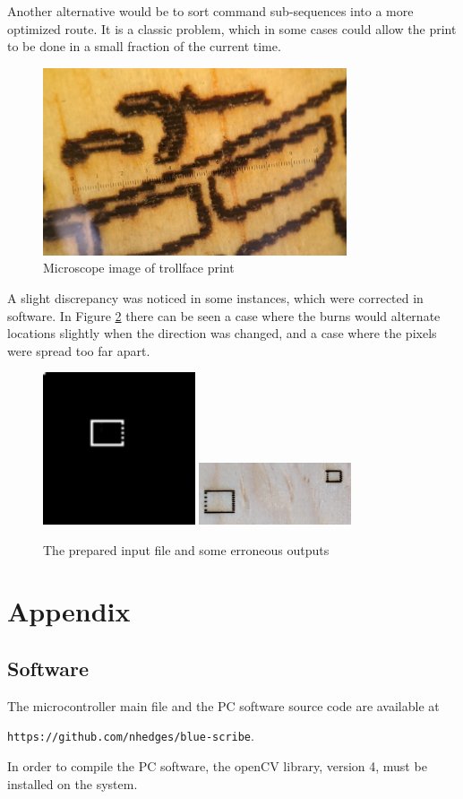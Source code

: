 \documentclass[11pt]{LaTeX-Classes/math-hw}
\begin{document}
Another alternative would be to sort command sub-sequences into a more optimized
route. It is a classic  problem, which in some cases
could allow the print to be done in a small fraction of the current time.

\begin{figure}[H]
  \begin{center}
    \includegraphics[width=0.8\textwidth]{burn-zoomed}
    \caption{Microscope image of trollface print}
    \label{fig:burn-zoomed}
  \end{center}
\end{figure}

A slight discrepancy was noticed in some instances, which were corrected in software.
In Figure \ref{fig:off-by-one} there can be seen a case where the burns would alternate
locations slightly when the direction was changed, and a case where the pixels were
spread too far apart.
\begin{figure}[H]
  \begin{center}
    \includegraphics[width=0.4\textwidth]{test4}
    \includegraphics[width=0.4\textwidth]{burn-errors}
    \caption{The prepared input file and some erroneous outputs}
    \label{fig:off-by-one}
  \end{center}
\end{figure}

\section*{Appendix}
\subsection{Software}
The microcontroller main file and the PC software source code
are available at

\texttt{https://github.com/nhedges/blue-scribe}.

In order to compile the PC software, the openCV library, version 4, must be installed on the system.
\end{document}
